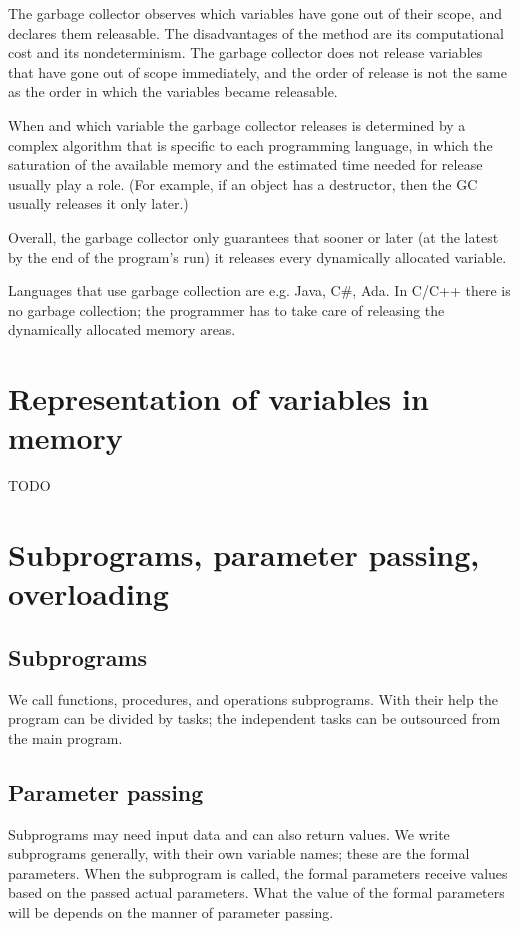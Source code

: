 \documentclass[margin=0px]{article}
\begin{document}
The garbage collector observes which variables have gone out of their scope, and declares them releasable. The disadvantages of the method are its computational cost and its nondeterminism. The garbage collector does not release variables that have gone out of scope immediately, and the order of release is not the same as the order in which the variables became releasable.

When and which variable the garbage collector releases is determined by a complex algorithm that is specific to each programming language, in which the saturation of the available memory and the estimated time needed for release usually play a role. (For example, if an object has a destructor, then the GC usually releases it only later.)

Overall, the garbage collector only guarantees that sooner or later (at the latest by the end of the program's run) it releases every dynamically allocated variable.

Languages that use garbage collection are e.g. Java, C\#, Ada. In C/C++ there is no garbage collection; the programmer has to take care of releasing the dynamically allocated memory areas.

\section{Representation of variables in memory}
TODO

\section{Subprograms, parameter passing, overloading}

\subsection{Subprograms}

We call functions, procedures, and operations subprograms. With their help the program can be divided by tasks; the independent tasks can be outsourced from the main program.

\subsection{Parameter passing}

Subprograms may need input data and can also return values. We write subprograms generally, with their own variable names; these are the formal parameters. When the subprogram is called, the formal parameters receive values based on the passed actual parameters. What the value of the formal parameters will be depends on the manner of parameter passing.
\end{document}
